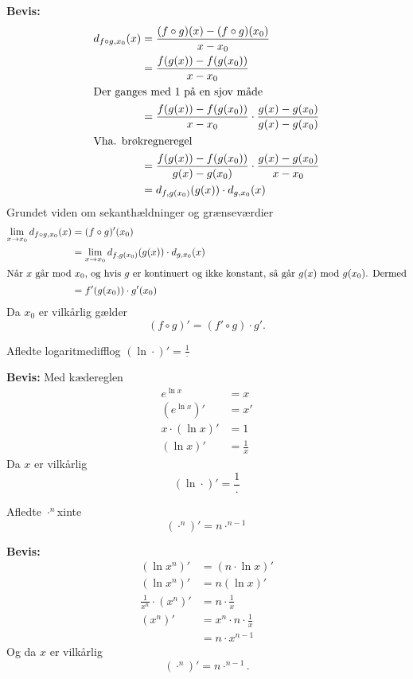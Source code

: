 \documentclass{article}
\begin{document}
\textbf{Bevis:}
\begin{align*}
	d_{f \circ g,x_0}(x) &= \frac{(f \circ g)(x) - (f \circ g)(x_0)}{x - x_0}\\
					  &= \frac{f(g(x)) - f(g(x_0))}{x - x_0}\\
	\intertext{Der ganges med 1 på en sjov måde}
					  &= \frac{f(g(x)) - f(g(x_0))}{x - x_0} \cdot 
					  \frac{g(x) - g(x_0)}{g(x) - g(x_0)}\\
	\intertext{Vha. brøkregneregel}
					  &= \frac{f(g(x)) - f(g(x_0))}{g(x) - g(x_0)} \cdot 
					  \frac{g(x) - g(x_0)}{x - x_0}\\
					  &= d_{f,g(x_0)}(g(x)) \cdot d_{g,x_0}(x)
\end{align*}
Grundet viden om sekanthældninger og grænseværdier
\begin{align*}
	\lim_{x \to x_0} d_{f \circ g,x_0}(x) &= (f \circ g)'(x_0)\\
	 		&= \lim_{x \to x_0} d_{f,g(x_0)}(g(x)) \cdot d_{g,x_0}(x)\\
	\intertext{Når $x$ går mod $x_0$, og hvis $g$ er kontinuert og ikke
	konstant, så går $g(x)$ mod $g(x_0)$. Dermed}
	 		&= f'(g(x_0)) \cdot g'(x_0)
\end{align*}
Da $x_0$ er vilkårlig gælder
\[
	(f \circ g)' = (f' \circ g) \cdot g'.
\] 

\begin{theorem}{Afledte logaritme}{difflog}
	$(\ln \cdot)' = \frac{1}{\cdot}$
\end{theorem}

\textbf{Bevis:}
Med kædereglen
\begin{align*}
	e^{\ln x} &= x\\
	\left( e^{\ln x} \right)' &= x'\\
	x \cdot (\ln x)' &= 1\\
	(\ln x)' &= \frac{1}{x}
\end{align*}
Da $x$ er vilkårlig
\[
	(\ln \cdot )' = \frac{1}{\cdot}
\] 

\begin{theorem}{Afledte $\cdot^{n}$}{xinte}
	\[
		(\cdot^n)' = n \cdot ^{n-1}
	\] 
\end{theorem}

\textbf{Bevis:}
\begin{align*}
	(\ln{x^n})' &= (n \cdot \ln{x})'\\
	(\ln{x^n})' &= n (\ln{x})'\\
	\frac{1}{x^n} \cdot (x^n)'	&= n \cdot \frac{1}{x}\\
	(x^n)' &= x^n \cdot n \cdot \frac{1}{x}\\
		   &= n \cdot x^{n-1}
\end{align*}
Og da $x$ er vilkårlig
\[
	(\cdot^n)' = n \cdot ^{n-1}.
\] 
\end{document}
